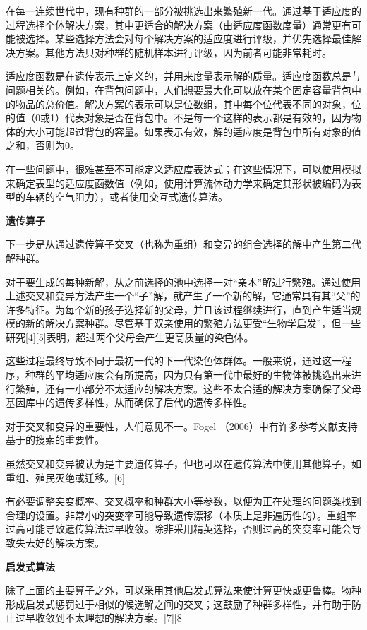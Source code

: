 在每一连续世代中，现有种群的一部分被挑选出来繁殖新一代。通过基于适应度的过程选择个体解决方案，其中更适合的解决方案（由适应度函数度量）通常更有可能被选择。某些选择方法会对每个解决方案的适应度进行评级，并优先选择最佳解决方案。其他方法只对种群的随机样本进行评级，因为前者可能非常耗时。

适应度函数是在遗传表示上定义的，并用来度量表示解的质量。适应度函数总是与问题相关的。例如，在背包问题中，人们想要最大化可以放在某个固定容量背包中的物品的总价值。解决方案的表示可以是位数组，其中每个位代表不同的对象，位的值（0或1）代表对象是否在背包中。不是每一个这样的表示都是有效的，因为物体的大小可能超过背包的容量。如果表示有效，解的适应度是背包中所有对象的值之和，否则为0。

在一些问题中，很难甚至不可能定义适应度表达式；在这些情况下，可以使用模拟来确定表型的适应度函数值（例如，使用计算流体动力学来确定其形状被编码为表型的车辆的空气阻力），或者使用交互式遗传算法。

\textbf{遗传算子}

下一步是从通过遗传算子交叉（也称为重组）和变异的组合选择的解中产生第二代解种群。

对于要生成的每种新解，从之前选择的池中选择一对“亲本”解进行繁殖。通过使用上述交叉和变异方法产生一个“子”解，就产生了一个新的解，它通常具有其“父”的许多特征。为每个新的孩子选择新的父母，并且该过程继续进行，直到产生适当规模的新的解决方案种群。尽管基于双亲使用的繁殖方法更受“生物学启发”，但一些研究[4][5]表明，超过两个父母会产生更高质量的染色体。

这些过程最终导致不同于最初一代的下一代染色体群体。一般来说，通过这一程序，种群的平均适应度会有所提高，因为只有第一代中最好的生物体被挑选出来进行繁殖，还有一小部分不太适应的解决方案。这些不太合适的解决方案确保了父母基因库中的遗传多样性，从而确保了后代的遗传多样性。

对于交叉和变异的重要性，人们意见不一。Fogel （2006）中有许多参考文献支持基于的搜索的重要性。

虽然交叉和变异被认为是主要遗传算子，但也可以在遗传算法中使用其他算子，如重组、殖民灭绝或迁移。[6]

有必要调整突变概率、交叉概率和种群大小等参数，以便为正在处理的问题类找到合理的设置。非常小的突变率可能导致遗传漂移（本质上是非遍历性的）。重组率过高可能导致遗传算法过早收敛。除非采用精英选择，否则过高的突变率可能会导致失去好的解决方案。

\textbf{启发式算法}

除了上面的主要算子之外，可以采用其他启发式算法来使计算更快或更鲁棒。物种形成启发式惩罚过于相似的候选解之间的交叉；这鼓励了种群多样性，并有助于防止过早收敛到不太理想的解决方案。[7][8]

